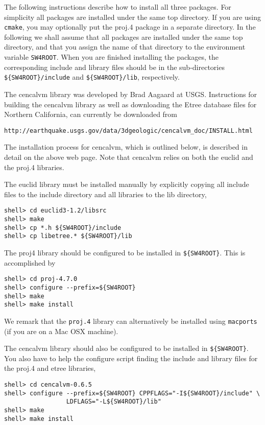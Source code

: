 \documentclass[11pt]{article}
\begin{document}
The following instructions describe how to install all three packages. For simplicity all packages
are installed under the same top directory. If you are using {\tt cmake}, you may optionally put the
proj.4 package in a separate directory. In the following we shall assume that all packages are
installed under the same top directory, and that you assign the name of that directory to the
environment variable \verb+SW4ROOT+. When you are finished installing the packages, the
corresponding include and library files should be in the sub-directories \verb+${SW4ROOT}/include+
and \verb+${SW4ROOT}/lib+, respectively.

The cencalvm library was developed by Brad Aagaard at USGS. Instructions for building the cencalvm
library as well as downloading the Etree database files for Northern California, can
currently be downloaded from
\begin{verbatim}
http://earthquake.usgs.gov/data/3dgeologic/cencalvm_doc/INSTALL.html
\end{verbatim}
The installation process for cencalvm, which is outlined below, is described in detail on the above
web page.  Note that cencalvm relies on both the euclid and the proj.4 libraries.

The euclid library must be installed manually by explicitly copying all include files to
the include directory and all libraries to the lib directory,
\begin{verbatim}
shell> cd euclid3-1.2/libsrc
shell> make
shell> cp *.h ${SW4ROOT}/include
shell> cp libetree.* ${SW4ROOT}/lib
\end{verbatim}
The proj4 library should be configured to be installed in \verb+${SW4ROOT}+. This is accomplished by
\begin{verbatim}
shell> cd proj-4.7.0
shell> configure --prefix=${SW4ROOT}
shell> make
shell> make install
\end{verbatim}
We remark that the {\tt proj.4} library can alternatively be installed using {\tt macports} (if you are
on a Mac OSX machine).

The cencalvm library should also be configured to be installed in \verb+${SW4ROOT}+. You also have to help
the configure script finding the include and library files for the proj.4 and etree libraries,
\begin{verbatim}
shell> cd cencalvm-0.6.5
shell> configure --prefix=${SW4ROOT} CPPFLAGS="-I${SW4ROOT}/include" \
                 LDFLAGS="-L${SW4ROOT}/lib"
shell> make
shell> make install
\end{verbatim}
\end{document}
